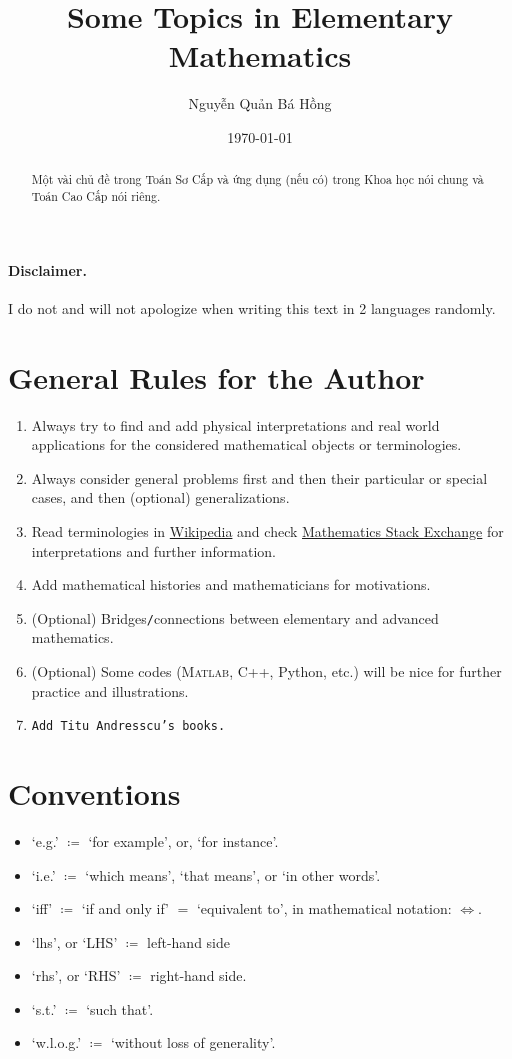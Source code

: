 \documentclass{article}
\title{Some Topics in Elementary Mathematics}
\author{Nguyễn Quản Bá Hồng}
\date{\today}
\numberwithin{equation}{section}
\begin{document}
\maketitle
\begin{abstract}
	Một vài chủ đề trong Toán Sơ Cấp và ứng dụng (nếu có) trong Khoa học nói chung và Toán Cao Cấp nói riêng.
\end{abstract}
\tableofcontents


\paragraph{Disclaimer.} I do not and will not apologize when writing this text in 2 languages randomly.

\section*{General Rules for the Author}
\begin{enumerate}
	\item Always try to find and add physical interpretations and real world applications for the considered mathematical objects or terminologies.
	\item Always consider general problems first and then their particular or special cases, and then (optional) generalizations.
	\item Read terminologies in \href{https://www.wikipedia.org/}{Wikipedia} and check \href{https://math.stackexchange.com/}{Mathematics Stack Exchange} for interpretations and further information.
	\item Add mathematical histories and mathematicians for motivations.
	\item (Optional) Bridges\texttt{/}connections between elementary and advanced mathematics.
	\item (Optional) Some codes (\textsc{Matlab}, C++, Python, etc.) will be nice for further practice and illustrations.
	\item \texttt{Add Titu Andresscu's books.}
\end{enumerate}

\section*{Conventions}
\begin{itemize}
	\item `e.g.' $\coloneqq$ `for example', or, `for instance'.
	\item `i.e.' $\coloneqq$ `which means', `that means', or `in other words'.
	\item `iff' $\coloneqq$ `if and only if' $=$ `equivalent to', in mathematical notation: $\Leftrightarrow$.
	\item `lhs', or `LHS' $\coloneqq$ left-hand side
	\item `rhs', or `RHS' $\coloneqq$ right-hand side.
	\item `s.t.' $\coloneqq$ `such that'.
	\item `w.l.o.g.' $\coloneqq$ `without loss of generality'.
\end{itemize}
\end{document}
